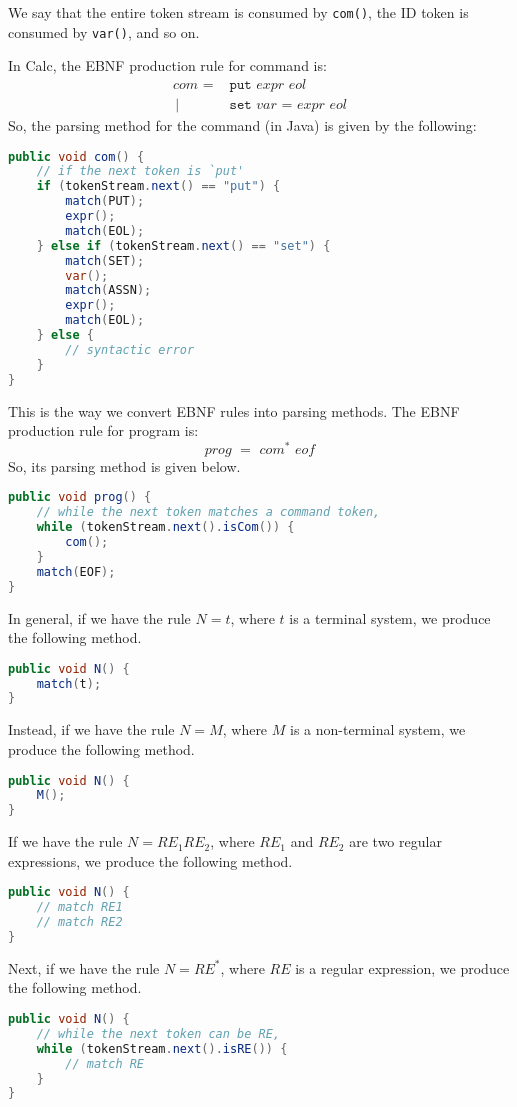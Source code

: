 \documentclass[a4paper, openany]{memoir}
\begin{document}
\noindent We say that the entire token stream is consumed by \texttt{com()}, the ID token is consumed by \texttt{var()}, and so on.

In Calc, the EBNF production rule for command is:
\begin{align*}
    \textit{com } =& \texttt{ put} \textit{ expr eol} \\
    \hspace{2pt} |& \texttt{ set} \textit{ var } \texttt{=} \textit{ expr eol}
\end{align*}
So, the parsing method for the command (in Java) is given by the following:
\begin{lstlisting}[language=java]
public void com() {
    // if the next token is `put'
    if (tokenStream.next() == "put") {
        match(PUT);
        expr();
        match(EOL);
    } else if (tokenStream.next() == "set") {
        match(SET);
        var();
        match(ASSN);
        expr();
        match(EOL);
    } else {
        // syntactic error
    }
}
\end{lstlisting}
This is the way we convert EBNF rules into parsing methods. The EBNF production rule for program is:
\[\textit{prog } = \textit{ com}^* \textit{ eof}\]
So, its parsing method is given below.
\begin{lstlisting}[language=java]
public void prog() {
    // while the next token matches a command token,
    while (tokenStream.next().isCom()) {
        com();
    }
    match(EOF);
}
\end{lstlisting}
In general, if we have the rule $N = t$, where $t$ is a terminal system, we produce the following method.
\begin{lstlisting}[language=java]
public void N() {
    match(t);
}
\end{lstlisting}
Instead, if we have the rule $N = M$, where $M$ is a non-terminal system, we produce the following method.
\begin{lstlisting}[language=java]
public void N() {
    M();
}
\end{lstlisting}
If we have the rule $N = RE_1 RE_2$, where $RE_1$ and $RE_2$ are two regular expressions, we produce the following method.
\begin{lstlisting}[language=java]
public void N() {
    // match RE1
    // match RE2
}
\end{lstlisting}
Next, if we have the rule $N = RE^*$, where $RE$ is a regular expression, we produce the following method.
\begin{lstlisting}[language=java]
public void N() {
    // while the next token can be RE,
    while (tokenStream.next().isRE()) {
        // match RE
    }
}
\end{lstlisting}
\end{document}
